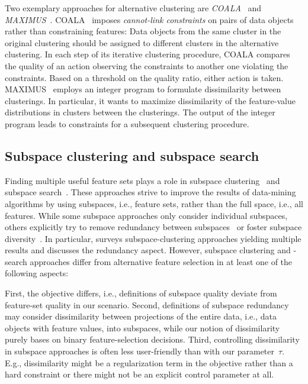 \documentclass{article}
\theoremstyle{definition}
\begin{document}
Two exemplary approaches for alternative clustering are \emph{COALA}~\cite{bae2006coala} and \emph{MAXIMUS}~\cite{bae2010clustering}.
COALA~\cite{bae2006coala} imposes \emph{cannot-link constraints} on pairs of data objects rather than constraining features:
Data objects from the same cluster in the original clustering should be assigned to different clusters in the alternative clustering.
In each step of its iterative clustering procedure, COALA compares the quality of an action observing the constraints to another one violating the constraints.
Based on a threshold on the quality ratio, either action is taken.
MAXIMUS~\cite{bae2010clustering} employs an integer program to formulate dissimilarity between clusterings.
In particular, it wants to maximize dissimilarity of the feature-value distributions in clusters between the clusterings.
The output of the integer program leads to constraints for a subsequent clustering procedure.

\subsection{Subspace clustering and subspace search}
\label{sec:afs:related-work:subspace}

Finding multiple useful feature sets plays a role in subspace clustering~\cite{hu2018subspace, mueller2009relevant} and subspace search~\cite{fouche2021efficient, nguyen20134s, trittenbach2019dimension}.
These approaches strive to improve the results of data-mining algorithms by using subspaces, i.e., feature sets, rather than the full space, i.e., all features.
While some subspace approaches only consider individual subspaces, others explicitly try to remove redundancy between subspaces~\cite{mueller2009relevant, nguyen20134s} or foster subspace diversity~\cite{fouche2021efficient, trittenbach2019dimension}.
In particular, \cite{hu2018subspace} surveys subspace-clustering approaches yielding multiple results and discusses the redundancy aspect.
However, subspace clustering and -search approaches differ from alternative feature selection in at least one of the following aspects:

First, the objective differs, i.e., definitions of subspace quality deviate from feature-set quality in our scenario.
Second, definitions of subspace redundancy may consider dissimilarity between projections of the entire data, i.e., data objects with feature values, into subspaces, while our notion of dissimilarity purely bases on binary feature-selection decisions.
Third, controlling dissimilarity in subspace approaches is often less user-friendly than with our parameter~$\tau$.
E.g., dissimilarity might be a regularization term in the objective rather than a hard constraint or there might not be an explicit control parameter at all.
\end{document}
